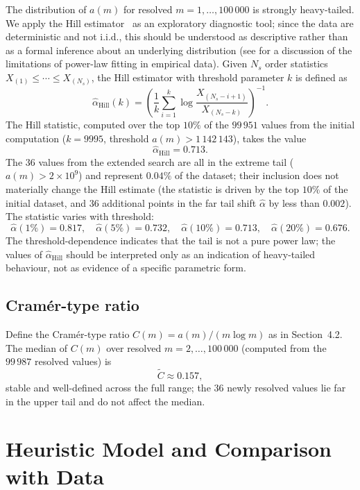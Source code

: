 \documentclass[12pt]{article}
\begin{document}
	The distribution of $a(m)$ for resolved $m = 1, \ldots, 100\,000$ is
	strongly heavy-tailed.
	We apply the Hill estimator~\cite{Hill1975} as an exploratory
	diagnostic tool; since the data are deterministic and not i.i.d.,
	this should be understood as descriptive rather than as a formal
	inference about an underlying distribution (see \cite{Clauset2009}
	for a discussion of the limitations of power-law fitting in empirical
	data).
	Given $N_s$ order statistics $X_{(1)} \leq \cdots \leq X_{(N_s)}$, the
	Hill estimator with threshold parameter $k$ is defined as
	\[
	\hat{\alpha}_{\mathrm{Hill}}(k)
	= \left(
	\frac{1}{k} \sum_{i=1}^{k}
	\log \frac{X_{(N_s-i+1)}}{X_{(N_s-k)}}
	\right)^{-1}.
	\]
	The Hill statistic, computed over the top $10\%$ of the $99\,951$
	values from the initial computation
	($k = 9995$, threshold $a(m) > 1\,142\,143$), takes the value
	\[
	\hat{\alpha}_{\mathrm{Hill}} = 0.713.
	\]
	The $36$ values from the extended search are all in the extreme tail
	($a(m) > 2 \times 10^9$) and represent $0.04\%$ of the dataset;
	their inclusion does not materially change the Hill estimate
	(the statistic is driven by the top $10\%$ of the initial dataset,
	and $36$ additional points in the far tail shift $\hat{\alpha}$ by
	less than $0.002$).
	The statistic varies with threshold:
	\[
	\hat{\alpha}(1\%) = 0.817, \quad
	\hat{\alpha}(5\%) = 0.732, \quad
	\hat{\alpha}(10\%) = 0.713, \quad
	\hat{\alpha}(20\%) = 0.676.
	\]
	The threshold-dependence indicates that the tail is not a pure power
	law; the values of $\hat{\alpha}_{\mathrm{Hill}}$ should be interpreted
	only as an indication of heavy-tailed behaviour, not as evidence of a
	specific parametric form.
	
	\subsection{Cram\'er-type ratio}
	
	Define the Cram\'er-type ratio $C(m) = a(m)/(m \log m)$ as in
	Section~4.2.
	The median of $C(m)$ over resolved $m = 2, \ldots, 100\,000$
	(computed from the $99\,987$ resolved values) is
	\[
	\widetilde{C} \approx 0.157,
	\]
	stable and well-defined across the full range; the $36$ newly resolved
	values lie far in the upper tail and do not affect the median.
	
	\section{Heuristic Model and Comparison with Data}
	\label{sec:heuristic}
	
\end{document}
